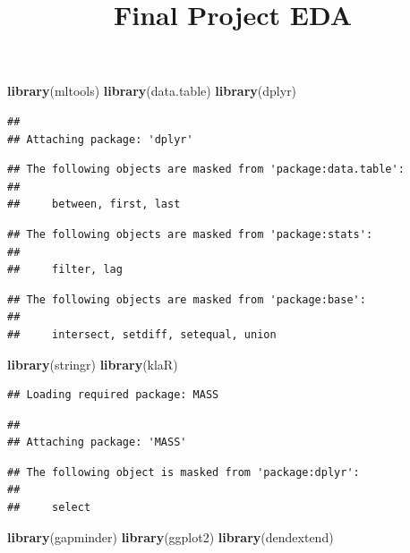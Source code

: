 \documentclass[]{article}
\title{Final Project EDA}
\author{}
\date{\vspace{-2.5em}}
\newenvironment{Shaded}{\begin{snugshade}}{\end{snugshade}}
\newcommand{\KeywordTok}[1]{\textcolor[rgb]{0.13,0.29,0.53}{\textbf{#1}}}
\newcommand{\NormalTok}[1]{#1}
\begin{document}
\maketitle

\begin{Shaded}
\begin{Highlighting}[]
\KeywordTok{library}\NormalTok{(mltools)}
\KeywordTok{library}\NormalTok{(data.table)}
\KeywordTok{library}\NormalTok{(dplyr)}
\end{Highlighting}
\end{Shaded}

\begin{verbatim}
## 
## Attaching package: 'dplyr'
\end{verbatim}

\begin{verbatim}
## The following objects are masked from 'package:data.table':
## 
##     between, first, last
\end{verbatim}

\begin{verbatim}
## The following objects are masked from 'package:stats':
## 
##     filter, lag
\end{verbatim}

\begin{verbatim}
## The following objects are masked from 'package:base':
## 
##     intersect, setdiff, setequal, union
\end{verbatim}

\begin{Shaded}
\begin{Highlighting}[]
\KeywordTok{library}\NormalTok{(stringr)}
\KeywordTok{library}\NormalTok{(klaR)}
\end{Highlighting}
\end{Shaded}

\begin{verbatim}
## Loading required package: MASS
\end{verbatim}

\begin{verbatim}
## 
## Attaching package: 'MASS'
\end{verbatim}

\begin{verbatim}
## The following object is masked from 'package:dplyr':
## 
##     select
\end{verbatim}

\begin{Shaded}
\begin{Highlighting}[]
\KeywordTok{library}\NormalTok{(gapminder)}
\KeywordTok{library}\NormalTok{(ggplot2)}
\KeywordTok{library}\NormalTok{(dendextend)}
\end{Highlighting}
\end{Shaded}
\end{document}
